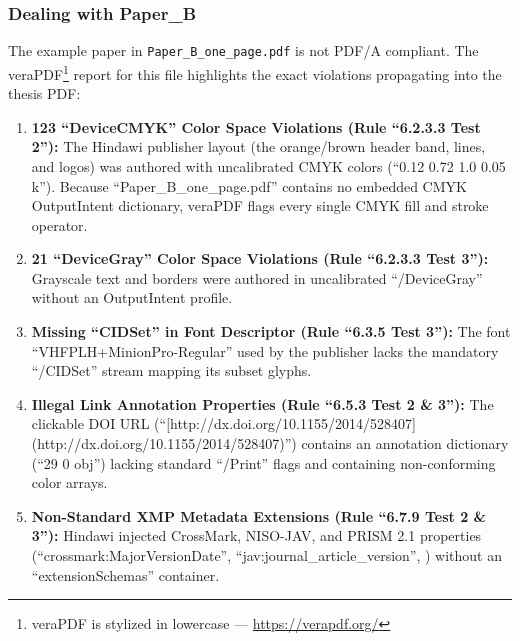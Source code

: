 \documentclass[12pt, twoside]{article}
\newcommand{\fname}[1]{\texttt{#1}}
\begin{document}
\subsubsection{Dealing with Paper\_B}
\label{sec:dealingWithPaperB}
The example paper in \fname{Paper\_B\_one\_page.pdf} is not PDF/A compliant.
The veraPDF\footnote{veraPDF is stylized in lowercase --- \url{https://verapdf.org/}} report for this file highlights the exact violations propagating into the thesis \gls{PDF}:
\begin{enumerate}
\item \textbf{123 \enquote{DeviceCMYK} Color Space Violations (Rule \enquote{6.2.3.3 Test 2}):}
The Hindawi publisher layout (the orange/brown header band, lines, and logos) was authored with uncalibrated CMYK colors (\enquote{0.12 0.72 1.0 0.05 k}). Because \enquote{Paper\_B\_one\_page.pdf} contains no embedded CMYK OutputIntent dictionary, veraPDF flags every single CMYK fill and stroke operator.

\item \textbf{21 \enquote{DeviceGray} Color Space Violations (Rule \enquote{6.2.3.3 Test 3}):}
Grayscale text and borders were authored in uncalibrated \enquote{/DeviceGray} without an OutputIntent profile.

\item \textbf{Missing \enquote{CIDSet} in Font Descriptor (Rule \enquote{6.3.5 Test 3}):}
The font \enquote{VHFPLH+MinionPro-Regular} used by the publisher lacks the mandatory \enquote{/CIDSet} stream mapping its subset glyphs.

\item \textbf{Illegal Link Annotation Properties (Rule \enquote{6.5.3 Test 2 \& 3}):}
The clickable DOI URL (\enquote{[http://dx.doi.org/10.1155/2014/528407](http://dx.doi.org/10.1155/2014/528407)}) contains an annotation dictionary (\enquote{29 0 obj}) lacking standard \enquote{/Print} flags and containing non-conforming color arrays.

\item \textbf{Non-Standard XMP Metadata Extensions (Rule \enquote{6.7.9 Test 2 \& 3}):}
Hindawi injected CrossMark, NISO-JAV, and PRISM 2.1 properties (\enquote{crossmark:MajorVersionDate}, \enquote{jav:journal\_article\_version}, \etc) without an \enquote{extensionSchemas} container.
\end{enumerate}
\end{document}
